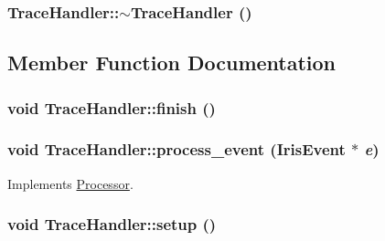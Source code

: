 \hypertarget{classTraceHandler_491147a0c061c2c3540e8e0e829602fe}{
\subsubsection[{$\sim$TraceHandler}]{\setlength{\rightskip}{0pt plus 5cm}TraceHandler::$\sim$TraceHandler ()}}
\label{classTraceHandler_491147a0c061c2c3540e8e0e829602fe}




\subsection{Member Function Documentation}
\hypertarget{classTraceHandler_0a0d8b0c9301bba86fc115cb6f3ebfc8}{
\subsubsection[{finish}]{\setlength{\rightskip}{0pt plus 5cm}void TraceHandler::finish ()}}
\label{classTraceHandler_0a0d8b0c9301bba86fc115cb6f3ebfc8}


\hypertarget{classTraceHandler_ce34c9fd6ca6893af23d1167348ee0c9}{
\subsubsection[{process\_\-event}]{\setlength{\rightskip}{0pt plus 5cm}void TraceHandler::process\_\-event ({\bf IrisEvent} $\ast$ {\em e})}}
\label{classTraceHandler_ce34c9fd6ca6893af23d1167348ee0c9}




Implements \hyperlink{classProcessor_18cdeefafbd8225cb3ad18dd098c0e08}{Processor}.\hypertarget{classTraceHandler_9311bd94c5ad0a6e354d2a0bd8b8699a}{
\subsubsection[{setup}]{\setlength{\rightskip}{0pt plus 5cm}void TraceHandler::setup ()}}
\label{classTraceHandler_9311bd94c5ad0a6e354d2a0bd8b8699a}




